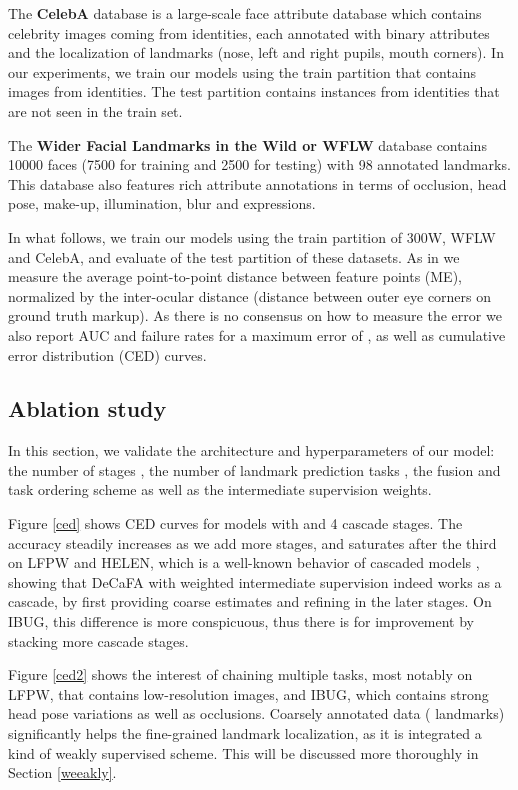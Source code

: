 \documentclass[10pt,twocolumn,letterpaper]{article}
\begin{document}
The \textbf{CelebA} database \cite{liu2015deep} is a large-scale face attribute database which contains  celebrity images coming from  identities, each annotated with  binary attributes and the localization of  landmarks (nose, left and right pupils, mouth corners). In our experiments, we train our models using the train partition that contains  images from  identities. The test partition contains  instances from  identities that are not seen in the train set.

The \textbf{Wider Facial Landmarks in the Wild or WFLW} database \cite{wu2018look} contains 10000 faces (7500 for training and 2500 for testing) with 98 annotated landmarks. This database also features rich attribute annotations in terms of occlusion, head pose, make-up, illumination, blur and expressions.

In what follows, we train our models using the train partition of 300W, WFLW and CelebA, and evaluate of the test partition of these datasets. As in \cite{Xiong2013,Ren2014,zhu2015face,zhang2016learning,miao2018direct,lv2017deep,xiao2016robust,honari2018improving} we measure the average point-to-point distance between feature points (ME), normalized by the inter-ocular distance (distance between outer eye corners on ground truth markup). As there is no consensus on how to measure the error we also report AUC and failure rates for a maximum error of , as well as cumulative error distribution (CED) curves.

\subsection{Ablation study}

In this section, we validate the architecture and hyperparameters of our model: the number of stages , the number of landmark prediction tasks , the fusion and task ordering scheme as well as the intermediate supervision weights.

Figure \ref{ced} shows CED curves for models with  and 4 cascade stages. The accuracy steadily increases as we add more stages, and saturates after the third on LFPW and HELEN, which is a well-known behavior of cascaded models \cite{Xiong2013,Ren2014}, showing that DeCaFA with weighted intermediate supervision indeed works as a cascade, by first providing coarse estimates and refining in the later stages. On IBUG, this difference is more conspicuous, thus there is for improvement by stacking more cascade stages.

Figure \ref{ced2} shows the interest of chaining multiple tasks, most notably on LFPW, that contains low-resolution images, and IBUG, which contains strong head pose variations as well as occlusions. Coarsely annotated data ( landmarks) significantly helps the fine-grained landmark localization, as it is integrated a kind of weakly supervised scheme. This will be discussed more thoroughly in Section \ref{weeakly}.
\end{document}
